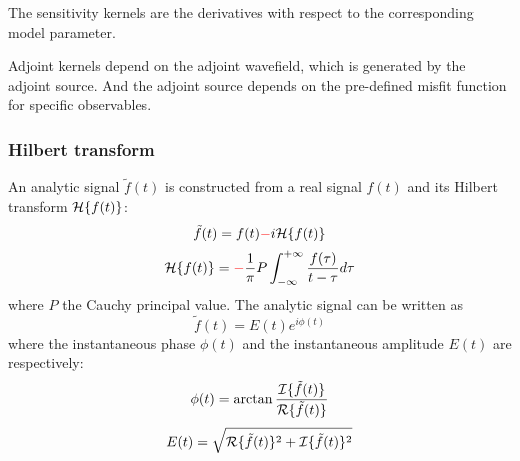 The sensitivity kernels are the \Frechet derivatives with respect to the corresponding model parameter.

Adjoint kernels depend on the adjoint wavefield, which is generated by the adjoint source.
And the adjoint source depends on the pre-defined misfit function for specific observables.

\subsubsection{Hilbert transform}
An analytic signal $\tilde f(t)$ is constructed from a real signal $f(t)$
and its Hilbert transform $\mathcal{H}\{f(t)\}$:
\[ \tilde f(t)=f(t) {\color{red}-} i\mathcal{H}\{f(t)\} \]
\[ \mathcal{H}\{f(t)\}= {\color{red}-} \frac{1}{\pi}P\int_{-\infty}^{+\infty}\frac{f(\tau)}{t-\tau}d\tau \]
where $P$ the Cauchy principal value. The analytic signal can be written as
\[ \tilde f(t)=E(t)e^{i\phi(t)} \]
where the instantaneous phase $\phi(t)$ and the instantaneous amplitude $E(t)$ are respectively:
\[ \phi(t)=\arctan\frac{\mathcal{I}\{\tilde f(t)\}}{\mathcal{R}\{\tilde f(t)\}} \]
\[ E(t)=\sqrt{\mathcal{R}\{\tilde f(t)\}^2+\mathcal{I}\{\tilde f(t)\}^2} \]


